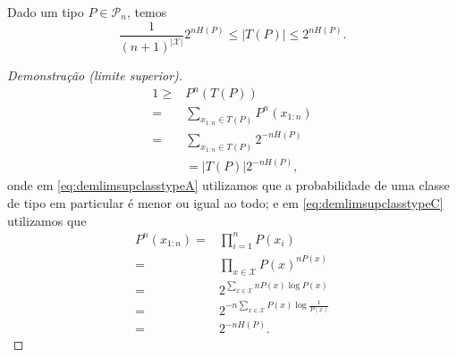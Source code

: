 \begin{theorem}\label{thm:limtamclasstip}
Dado um tipo $P \in \mathcal{P}_n$, temos
\begin{equation}\label{eq:limtamclasstip}
\frac{1}{(n+1)^{\vert \mathcal{X} \vert}} 2^{nH(P)} \leq \vert T(P) \vert \leq 2^{nH(P)} .
\end{equation}
\end{theorem}
\begin{proof}[Demonstração (limite superior)]
\begin{subequations}\label{eq:demlimsupclasstype}
\begin{align}
  1 \geq{}& P^{n} (T(P)) \label{eq:demlimsupclasstypeA}\\
    ={}& \sum_{x_{1:n} \in T(P)} P^{n} (x_{1:n}) \label{eq:demlimsupclasstypeB}\\
    ={}& \sum_{x_{1:n} \in T(P)} 2^{-nH(P)} \label{eq:demlimsupclasstypeC}\\
    &= \vert T(P) \vert 2^{-nH(P)} ,\label{eq:demlimsupclasstypeD}
\end{align}
\end{subequations}
onde em \ref{eq:demlimsupclasstypeA} utilizamos que a probabilidade de uma classe de tipo em particular
é menor ou igual ao todo; e em \ref{eq:demlimsupclasstypeC} utilizamos que
\begin{subequations}
  \begin{align}
     P^{n} (x_{1:n}) ={}& \prod_{i=1}^n P(x_i) \\
     ={}& \prod_{x \in \mathcal{X}} P(x)^{nP(x)} \\
     ={}& 2^{\sum_{x \in \mathcal{X}} nP(x) \log P(x)} \\
     ={}& 2^{-n \sum_{x \in \mathcal{X}} P(x) \log \frac{1}{P(x)}} \\
     ={}& 2^{-nH(P)} .
  \end{align}
\end{subequations}
\end{proof}
